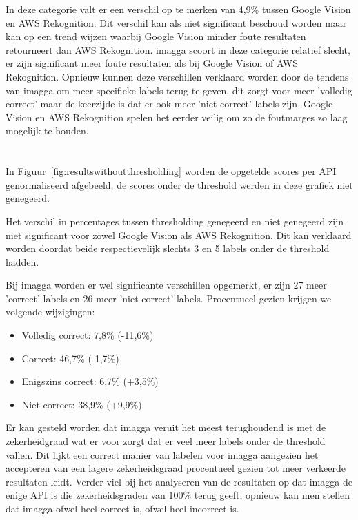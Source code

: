 In deze categorie valt er een verschil op te merken van 4,9\% tussen Google Vision en AWS Rekognition. Dit verschil kan als niet significant beschoud worden maar kan op een trend wijzen waarbij Google Vision minder foute resultaten retourneert dan AWS Rekognition. imagga scoort in deze categorie relatief slecht, er zijn significant meer foute resultaten als bij Google Vision of AWS Rekognition. Opnieuw kunnen deze verschillen verklaard worden door de tendens van imagga om meer specifieke labels terug te geven, dit zorgt voor meer 'volledig correct' maar de keerzijde is dat er ook meer 'niet correct' labels zijn. Google Vision en AWS Rekognition spelen het eerder veilig om zo de foutmarges zo laag mogelijk te houden.

\section{}
\label{sec:resultaten-zonder-thresholding}
In Figuur~\ref{fig:resultswithoutthresholding} worden de opgetelde scores per API genormaliseerd afgebeeld, de scores onder de threshold werden in deze grafiek niet genegeerd.

Het verschil in percentages tussen thresholding genegeerd en niet genegeerd zijn niet significant voor zowel Google Vision als AWS Rekognition. Dit kan verklaard worden doordat beide respectievelijk slechts 3 en 5 labels onder de threshold hadden.

Bij imagga worden er wel significante verschillen opgemerkt, er zijn 27 meer 'correct' labels en 26 meer 'niet correct' labels. Procentueel gezien krijgen we volgende wijzigingen:
\begin{itemize}
    \item Volledig correct: 7,8\% (-11,6\%)
    \item Correct: 46,7\% (-1,7\%) 
    \item Enigszins correct: 6,7\% (+3,5\%)
    \item Niet correct: 38,9\% (+9,9\%)
\end{itemize}

Er kan gesteld worden dat imagga veruit het meest terughoudend is met de zekerheidgraad wat er voor zorgt dat er veel meer labels onder de threshold vallen. Dit lijkt een correct manier van labelen voor imagga aangezien het accepteren van een lagere zekerheidsgraad procentueel gezien tot meer verkeerde resultaten leidt. Verder viel bij het analyseren van de resultaten op dat imagga de enige API is die zekerheidsgraden van 100\% terug geeft, opnieuw kan men stellen dat imagga ofwel heel correct is, ofwel heel incorrect is.

